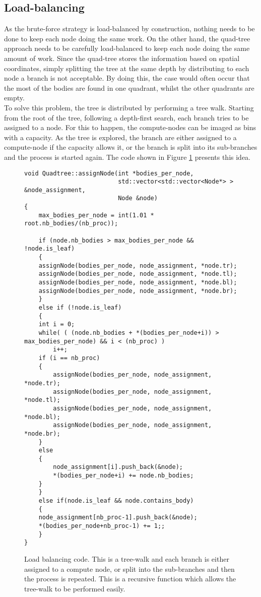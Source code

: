 \subsection{Load-balancing}\label{sec:lb}
As the brute-force strategy is load-balanced by construction, nothing needs to be done to keep each node doing the same work. On the other hand, the quad-tree approach needs to be carefully load-balanced to keep each node doing the same amount of work. Since the quad-tree stores the information based on spatial coordinates, simply splitting the tree at the same depth by distributing to each node a branch is not acceptable. By doing this, the case would often occur that the most of the bodies are found in one quadrant, whilst the other quadrants are empty.\\
To solve this problem, the tree is distributed by performing a tree walk. Starting from the root of the tree, following a depth-first search, each  branch tries to be assigned to a node. For this to happen, the compute-nodes can be imaged as bins with a capacity. As the tree is explored, the branch are either assigned to a compute-node if the capacity allows it, or the branch is split into its sub-branches and the process is started again. The code shown in Figure \ref{fig:load-balancing} presents this idea.
\begin{figure}[H]
  \begin{adjustwidth}{-0.5cm}{-0.5cm}   

  \begin{verbatim}
void Quadtree::assignNode(int *bodies_per_node,
                          std::vector<std::vector<Node*> > &node_assignment,
                          Node &node)
{
    max_bodies_per_node = int(1.01 * root.nb_bodies/(nb_proc));

    if (node.nb_bodies > max_bodies_per_node && !node.is_leaf)
    {
	assignNode(bodies_per_node, node_assignment, *node.tr);
	assignNode(bodies_per_node, node_assignment, *node.tl);
	assignNode(bodies_per_node, node_assignment, *node.bl);
	assignNode(bodies_per_node, node_assignment, *node.br);
    }
    else if (!node.is_leaf)
    {
	int i = 0;
	while( ( (node.nb_bodies + *(bodies_per_node+i)) > max_bodies_per_node) && i < (nb_proc) )	
	    i++;
	if (i == nb_proc)
	{	  
	    assignNode(bodies_per_node, node_assignment, *node.tr);
	    assignNode(bodies_per_node, node_assignment, *node.tl);
	    assignNode(bodies_per_node, node_assignment, *node.bl);
	    assignNode(bodies_per_node, node_assignment, *node.br);
	}
	else
	{
	    node_assignment[i].push_back(&node);
	    *(bodies_per_node+i) += node.nb_bodies;
	}	
    }
    else if(node.is_leaf && node.contains_body)
    {
	node_assignment[nb_proc-1].push_back(&node);
	*(bodies_per_node+nb_proc-1) += 1;;
    }
}
  \end{verbatim}
\caption{Load balancing code. This is a tree-walk and each branch is either assigned to a compute node, or split into the sub-branches and then the process is repeated. This is a recursive function which allows the tree-walk to be performed easily.}
\label{fig:load-balancing}
  \end{adjustwidth}

\end{figure}
